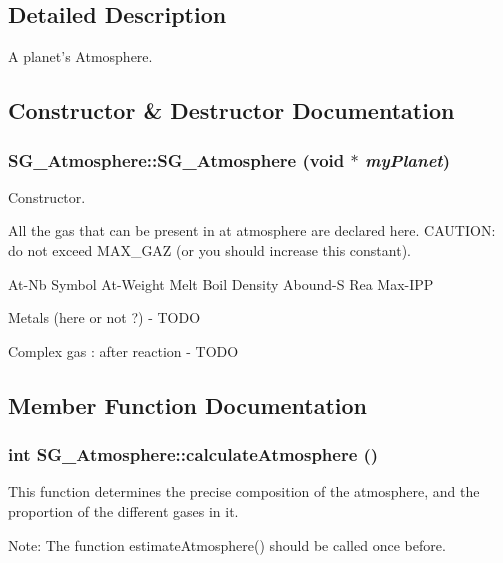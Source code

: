 \subsection{Detailed Description}
A planet's Atmosphere. 



\subsection{Constructor \& Destructor Documentation}
\subsubsection{\setlength{\rightskip}{0pt plus 5cm}SG\_\-Atmosphere::SG\_\-Atmosphere (void $\ast$ {\em my\-Planet})}\label{class_s_g___atmosphere_a0}


Constructor. 

All the gas that can be present in at atmosphere are declared here. CAUTION: do not exceed MAX\_\-GAZ (or you should increase this constant).

At-Nb Symbol At-Weight Melt Boil Density Abound-S Rea Max-IPP

Metals (here or not ?) - TODO

Complex gas : after reaction - TODO 

\subsection{Member Function Documentation}
\subsubsection{\setlength{\rightskip}{0pt plus 5cm}int SG\_\-Atmosphere::calculate\-Atmosphere ()}\label{class_s_g___atmosphere_a2}


This function determines the precise composition of the atmosphere, and the proportion of the different gases in it. 

Note: The function estimate\-Atmosphere() should be called once before. 

